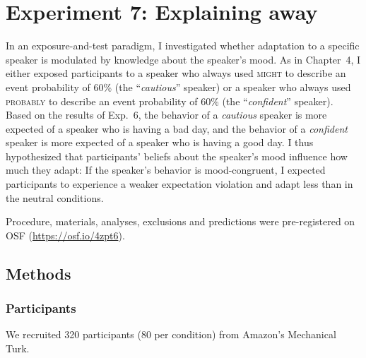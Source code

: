 

\section{Experiment 7: Explaining away}

In an exposure-and-test paradigm, I investigated whether adaptation to a specific speaker is modulated by knowledge about the speaker's mood. As in Chapter~4, I either exposed participants to a speaker who always used \textsc{might} to describe an event probability of 60\% (the ``\textit{cautious}'' speaker) or a speaker who always used \textsc{probably} to describe an event probability of 60\% (the ``\textit{confident}'' speaker). Based on the results of Exp.~6, the behavior of a \textit{cautious} speaker is more expected of a speaker who is having a bad day, and the behavior of a \textit{confident} speaker is more expected of a speaker who is having a good day. I thus hypothesized that participants' beliefs about the speaker's mood influence how much they adapt: If the speaker's behavior is mood-congruent, I expected participants to experience a weaker expectation violation and adapt less than in the neutral conditions.

Procedure, materials, analyses, exclusions and predictions were pre-registered on OSF (\url{https://osf.io/4zpt6}).

\subsection{Methods}

\subsubsection{Participants} We recruited 320 participants (80 per condition) from Amazon's Mechanical Turk. 

